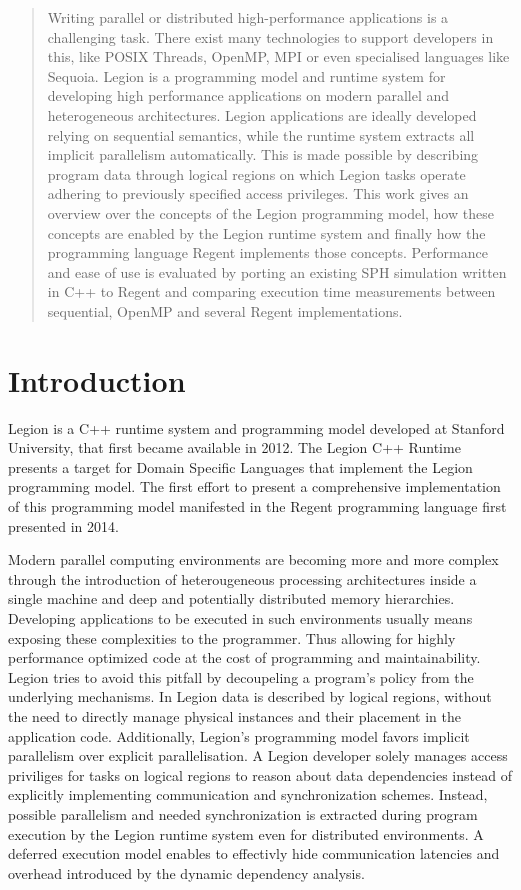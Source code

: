 \documentclass{article}      %
\begin{document}
\pagebreak

\tableofcontents

\pagebreak

\begin{abstract}
	Writing parallel or distributed high-performance applications is a challenging task. There exist many technologies to support developers in this, 
	like POSIX Threads, OpenMP, MPI or even specialised languages like Sequoia. Legion is a programming model and runtime system for developing high performance applications on modern parallel and heterogeneous architectures. Legion applications are ideally developed relying on sequential semantics, while the runtime system extracts all implicit parallelism automatically. This is made possible by describing program data through logical regions on which Legion tasks operate adhering to previously specified access privileges. This work gives an overview over the concepts of the Legion programming model, how these concepts are enabled by the Legion runtime system and finally how the programming language Regent implements those concepts. Performance and ease of use is evaluated by porting an existing SPH simulation written in C++ to Regent and comparing execution time measurements between sequential, OpenMP and several Regent implementations. 
\end{abstract}

\section{Introduction}
Legion is a C++ runtime system and programming model developed at Stanford University, that first became available in 2012. The Legion C++ Runtime presents a target for Domain Specific Languages that implement the Legion programming model. The first effort to present a comprehensive implementation of this programming model manifested in the Regent programming language first presented in 2014. 

Modern parallel computing environments are becoming more and more complex through the introduction of heterougeneous processing architectures inside a single machine and deep and potentially distributed memory hierarchies. Developing applications to be executed in such environments usually means exposing these complexities to the programmer. Thus allowing for highly performance optimized code at the cost of programming and maintainability. Legion tries to avoid this pitfall by decoupeling a program's policy from the underlying mechanisms. In Legion data is described by logical regions, without the need to directly manage physical instances and their placement in the application code. Additionally, Legion's programming model favors implicit parallelism over explicit parallelisation. A Legion developer solely manages access priviliges for tasks on logical regions to reason about data dependencies instead of explicitly implementing communication and synchronization schemes. Instead, possible parallelism and needed synchronization is extracted during program execution by the Legion runtime system even for distributed environments. A deferred execution model enables to effectivly hide communication latencies and overhead introduced by the dynamic dependency analysis. 
\end{document}
